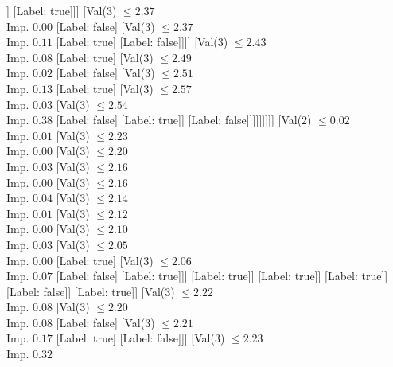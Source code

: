 \documentclass[margin=10pt]{standalone}
\begin{document}
\begin{forest}
														[Val($3$) $ \leq 2.32$ \\ Imp. $0.50$
															[Label: true]
															[Label: false]]
														[Label: true]]]
												[Val($3$) $ \leq 2.37$ \\ Imp. $0.00$
													[Label: false]
													[Val($3$) $ \leq 2.37$ \\ Imp. $0.11$
														[Label: true]
														[Label: false]]]]
											[Val($3$) $ \leq 2.43$ \\ Imp. $0.08$
												[Label: true]
												[Val($3$) $ \leq 2.49$ \\ Imp. $0.02$
													[Label: false]
													[Val($3$) $ \leq 2.51$ \\ Imp. $0.13$
														[Label: true]
														[Val($3$) $ \leq 2.57$ \\ Imp. $0.03$
															[Val($3$) $ \leq 2.54$ \\ Imp. $0.38$
																[Label: false]
																[Label: true]]
															[Label: false]]]]]]]]]
							[Val($2$) $ \leq 0.02$ \\ Imp. $0.01$
								[Val($3$) $ \leq 2.23$ \\ Imp. $0.00$
									[Val($3$) $ \leq 2.20$ \\ Imp. $0.03$
										[Val($3$) $ \leq 2.16$ \\ Imp. $0.00$
											[Val($3$) $ \leq 2.16$ \\ Imp. $0.04$
												[Val($3$) $ \leq 2.14$ \\ Imp. $0.01$
													[Val($3$) $ \leq 2.12$ \\ Imp. $0.00$
														[Val($3$) $ \leq 2.10$ \\ Imp. $0.03$
															[Val($3$) $ \leq 2.05$ \\ Imp. $0.00$
																[Label: true]
																[Val($3$) $ \leq 2.06$ \\ Imp. $0.07$
																	[Label: false]
																	[Label: true]]]
															[Label: true]]
														[Label: true]]
													[Label: true]]
												[Label: false]]
											[Label: true]]
										[Val($3$) $ \leq 2.22$ \\ Imp. $0.08$
											[Val($3$) $ \leq 2.20$ \\ Imp. $0.08$
												[Label: false]
												[Val($3$) $ \leq 2.21$ \\ Imp. $0.17$
													[Label: true]
													[Label: false]]]
											[Val($3$) $ \leq 2.23$ \\ Imp. $0.32$

\end{forest}
\end{document}
